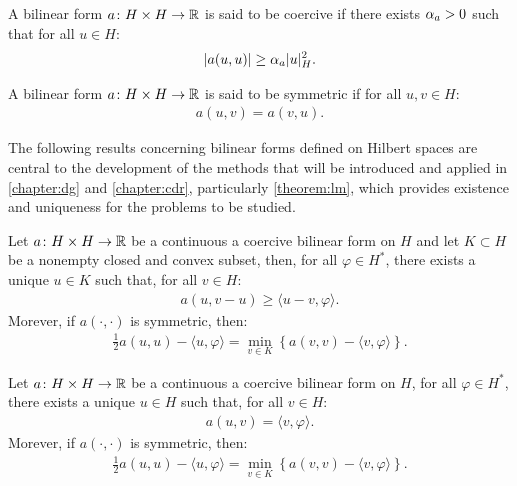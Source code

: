 \begin{definition}
    A bilinear form $a \colon H \times H \rightarrow \mathbb{R}$ is said to be coercive if there exists $\alpha_{a} > 0$ such that for all $u \in H$:
    \begin{gather}
        \lvert a(u, u) \rvert \geq \alpha_{a} \lvert u \rvert_H^2.
    \end{gather}
\end{definition}

\begin{definition}
    A bilinear form $a \colon H \times H \rightarrow \mathbb{R}$ is said to be symmetric if for all $u, v \in H$:
    \begin{gather}
        a(u, v) = a(v, u).
    \end{gather}
\end{definition}

The following results concerning bilinear forms defined on Hilbert spaces are central to the development of the methods that will be introduced and applied in \cref{chapter:dg} and \cref{chapter:cdr}, particularly \cref{theorem:lm}, which provides existence and uniqueness for the problems to be studied.

\begin{theorem}[Stampacchia]
    Let $a \colon H \times H \rightarrow \mathbb{R}$ be a continuous a coercive bilinear form on $H$ and let $K \subset H$ be a nonempty closed and convex subset, then, for all $\varphi \in H^*$, there exists a unique $u \in K$ such that, for all $v \in H$:
    \begin{gather}
        a(u, v - u) \geq \langle u - v, \varphi \rangle.
    \end{gather}
    Morever, if $a(\cdot, \cdot)$ is symmetric, then:
    \begin{gather}
        \frac{1}{2} a(u, u) - \langle u, \varphi \rangle = \min_{v \in K} \left\{ a(v, v) - \langle v, \varphi \rangle \right\}.
    \end{gather}
\end{theorem}

\begin{corollary} \label{theorem:lm}
    Let $a \colon H \times H \rightarrow \mathbb{R}$ be a continuous a coercive bilinear form on $H$, for all $\varphi \in H^*$, there exists a unique $u \in H$ such that, for all $v \in H$:
    \begin{gather}
        a(u, v) = \langle v, \varphi \rangle.
    \end{gather}
    Morever, if $a(\cdot, \cdot)$ is symmetric, then:
    \begin{gather}
        \frac{1}{2} a(u, u) - \langle u, \varphi \rangle = \min_{v \in K} \left\{ a(v, v) - \langle v, \varphi \rangle \right\}.
    \end{gather}
\end{corollary}

